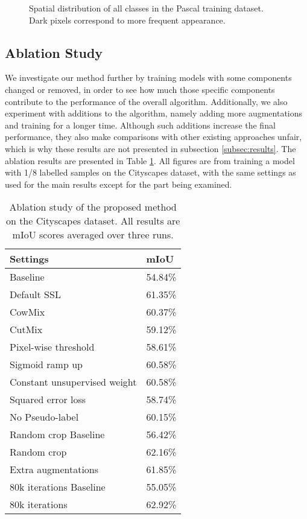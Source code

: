 \documentclass[10pt,twocolumn,letterpaper]{article}
\begin{document}
\begin{figure}[h!]
    \caption{Spatial distribution of all classes in the Pascal training dataset. Dark pixels correspond to more frequent appearance.}
    \label{fig:spatialPascal}
\end{figure}





\subsection{Ablation Study}

We investigate our method further by training models with some components changed or removed, in order to see how much those specific components contribute to the performance of the overall algorithm. Additionally, we also experiment with additions to the algorithm, namely adding more augmentations and training for a longer time. Although such additions increase the final performance, they also make comparisons with other existing approaches unfair, which is why these results are not presented in subsection \ref{subsec:results}. The ablation results are presented in Table \ref{tab:Ablation}. All figures are from training a model with 1/8 labelled samples on the Cityscapes dataset, with the same settings as used for the main results except for the part being examined.

\begin{table}[h]
    \centering
    \caption{Ablation study of the proposed method on the Cityscapes dataset. All results are mIoU scores averaged over three runs.}
    \begin{tabular}{ l l } 
        Settings &  mIoU \\
        \hline \hline
        Baseline& 54.84\% \\
        Default SSL & 61.35\% \\ 
        \hline 
        CowMix  & 60.37\% \\
        CutMix & 59.12\% \\
        \hline 
        Pixel-wise threshold  & 58.61\%\\
        Sigmoid ramp up  & 60.58\% \\
        Constant unsupervised weight  & 60.58\% \\
        \hline 
        Squared error loss   & 58.74\% \\
        \hline
        No Pseudo-label & 60.15\% \\
        \hline
        Random crop Baseline & 56.42\% \\
        Random crop & 62.16\% \\
        \hline
        Extra augmentations & 61.85\% \\
        \hline
        80k iterations Baseline & 55.05\% \\
        80k iterations & 62.92\% \\

        \hline
    \end{tabular}
    \label{tab:Ablation}
\end{table}{}
\end{document}
